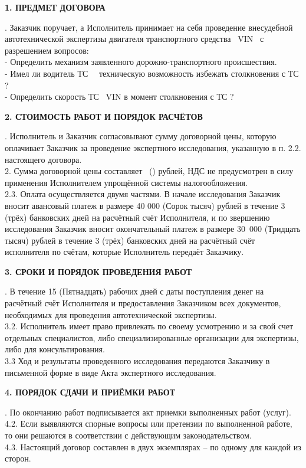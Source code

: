 \documentclass[a4paper,12pt,english,notitlepage]{report}
\begin{document}
         
\begin{center}
	\textbf{1. ПРЕДМЕТ ДОГОВОРА}
\end{center}
\vspace{-3mm}
 . Заказчик поручает, а Исполнитель принимает на себя проведение внесудебной автотехнической экспертизы двигателя  транспортного средства  \, VIN \vin\ с разрешением вопросов:\\
 - Определить механизм заявленного дорожно-транспортного происшествия.\\
 - Имел ли водитель ТС \,   \, техническую возможность избежать столкновения с ТС ?\\ 
- Определить скорость ТС  \, VIN \vin в момент столкновения с ТС ?


\begin{center}
	\textbf{2. СТОИМОСТЬ РАБОТ И ПОРЯДОК РАСЧЁТОВ}
\end{center}
\vspace{-3mm}
 . Исполнитель и Заказчик согласовывают сумму договорной цены, которую оплачивает Заказчик   за проведение экспертного исследования, указанную в п. 2.2. настоящего договора.\\ 
2. Сумма договорной цены составляет   \, () рублей, НДС не предусмотрен в силу применения Исполнителем упрощённой системы налогообложения.\\
2.3. Оплата осуществляется двумя частями. В начале исследования Заказчик вносит авансовый платеж в размере 40 000 (Сорок тысяч)  рублей в течение 3 (трёх) банковских дней на расчётный счёт Исполнителя, и по звершению исследования Заказчик вносит окончательный платеж в размере 30~000 (Тридцать тысяч) рублей в течение 3 (трёх) банковских дней на расчётный счёт исполнителя по счётам, которые Исполнитель передаёт Заказчику.

\begin{center}
	\textbf{3. СРОКИ И ПОРЯДОК ПРОВЕДЕНИЯ РАБОТ}
\end{center}
\vspace{-3mm}
 . В течение 15 (Пятнадцать) рабочих дней с даты поступления денег на расчётный счёт
Исполнителя и предоставления Заказчиком всех документов,
необходимых для проведения автотехнической экспертизы.\\
3.2. Исполнитель имеет право привлекать по своему усмотрению и за свой счет отдельных 
специалистов, либо специализированные организации для экспертизы, либо для консультирования.\\
3.3 Ход и результаты проведенного исследования передаются Заказчику в письменной форме в виде Акта экспертного исследования.
\begin{center}
	\textbf{4. ПОРЯДОК СДАЧИ И ПРИЁМКИ РАБОТ}
\end{center}
\vspace{-3mm}
 . По окончанию работ подписывается акт приемки выполненных работ (услуг).\\
4.2. Если выявляются спорные вопросы или претензии по выполненной работе, то они решаются в соответствии с действующим законодательством.\\
4.3. Настоящий договор составлен в двух экземплярах – по одному для каждой из сторон.
\end{document}
